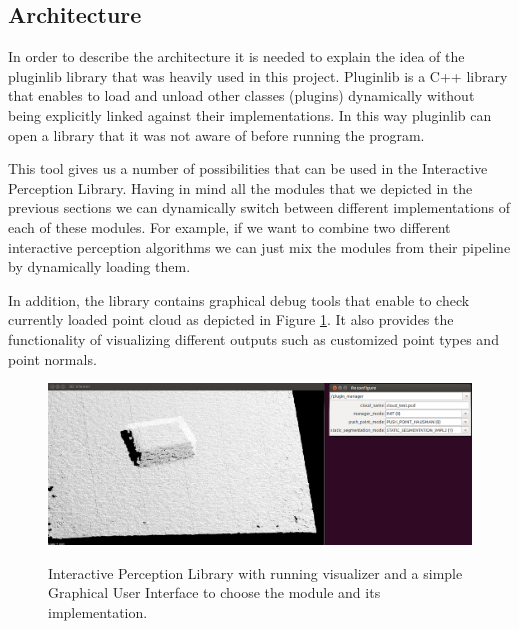 \subsection{Architecture}

In order to describe the architecture it is needed to explain the idea of the pluginlib library that was heavily used in this project. Pluginlib is a C++ library that enables to load and unload other classes (plugins) dynamically without being explicitly linked against their implementations. In this way pluginlib can open a library that it was not aware of before running the program. 

This tool gives us a number of possibilities that can be used in the Interactive Perception Library. Having in mind all the modules that we depicted in the previous sections we can dynamically switch between different implementations of each of these modules. For example, if we want to combine two different interactive perception algorithms we can just mix the modules from their pipeline by dynamically loading them. 

In addition, the library contains graphical debug tools that enable to check currently loaded point cloud as depicted in Figure \ref{fig:ipl}. It also provides the functionality of visualizing different outputs such as customized point types and point normals.

\begin{figure}

{\includegraphics[width=1.1\columnwidth]{figures/ipl.png}}

\caption{Interactive Perception Library with running visualizer and a simple Graphical User Interface to choose the module and its implementation.}
\label{fig:ipl}
\end{figure}

